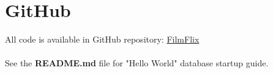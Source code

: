 \documentclass[12pt, a4paper]{article}
\begin{document}
\section*{GitHub}

All code is available in GitHub repository: \href{https://github.com/Kggupta/FilmFlix}{FilmFlix}
\\\\See the \textbf{README.md} file for "Hello World" database startup guide.
\end{document}
